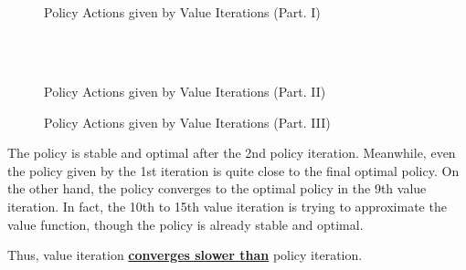 \documentclass{article}
\begin{document}
\begin{figure}[htbp]
    \centering
    \\
    \\
    \caption{Policy Actions given by Value Iterations (Part. I)}
    \label{fig:act-value-1}
\end{figure}

\begin{figure}
    \centering
    \\
    \\
    \caption{Policy Actions given by Value Iterations (Part. II)}
    \label{fig:act-value-2}
\end{figure}

\begin{figure}
    \centering
    \caption{Policy Actions given by Value Iterations (Part. III)}
    \label{fig:fig-value-3}
\end{figure}

The policy is stable and optimal after the 2nd policy iteration. Meanwhile, even the policy given by the 1st iteration is quite close to the final optimal policy. On the other hand, the policy converges to the optimal policy in the 9th value iteration. In fact, the 10th to 15th value iteration is trying to approximate the value function, though the policy is already stable and optimal.

Thus, value iteration \underline{\textbf{converges slower than}} policy iteration. 
\end{document}
